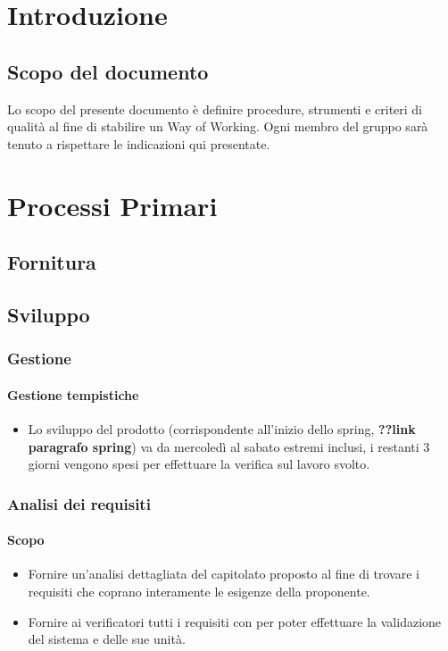 \documentclass[a4paper, 12pt]{article}
\begin{document}
\makefrontpage

\makeversioni

\tableofcontents
\pagebreak

\section{Introduzione}
\subsection{Scopo del documento}
Lo scopo del presente documento è definire procedure, strumenti e criteri di qualità al fine di stabilire un Way of Working. Ogni membro del gruppo sarà tenuto a rispettare le indicazioni qui presentate.

\section{Processi Primari}
\subsection{Fornitura}\label{fornitura}

\subsection{Sviluppo}\label{processi-primari-sviluppo}
\subsubsection{Gestione}
\paragraph{Gestione tempistiche}
\begin{itemize}
	\item Lo sviluppo del prodotto (corrispondente all'inizio dello spring, \textbf{??link paragrafo spring})
	va da mercoledì al sabato estremi inclusi, i restanti 3 giorni vengono spesi per effettuare la verifica
	sul lavoro svolto. 
\end{itemize}
\subsubsection{Analisi dei requisiti}
\paragraph{Scopo}
\begin{itemize}
	\item Fornire un'analisi dettagliata del capitolato proposto al fine 
	di trovare i requisiti che coprano interamente le esigenze della proponente.
	\item Fornire ai verificatori tutti i requisiti con per poter effettuare la 
	validazione del sistema e delle sue unità.
\end{itemize}
\end{document}

